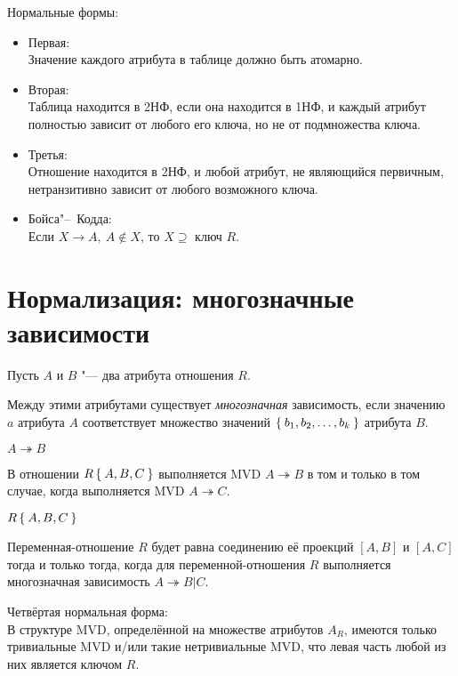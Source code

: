 Нормальные формы:
\begin{itemize}
	\item Первая: \\
		Значение каждого атрибута в таблице должно быть атомарно.
	\item Вторая: \\
		Таблица находится в 2НФ, если она находится в 1НФ, и каждый атрибут полностью зависит от любого его ключа, но не от подмножества ключа.
	\item Третья: \\
		Отношение находится в 2НФ, и любой атрибут, не являющийся первичным, нетранзитивно зависит от любого возможного ключа.
	\item Бойса"--~Кодда: \\
		Если $ X \to A, ~ A \not\in X $, то $ X \supseteq $ ключ $ R $.
\end{itemize}

\section{Нормализация: многозначные зависимости}

\begin{definition}
	Пусть $ A $ и $ B $ "--- два атрибута отношения $ R $.

	Между этими атрибутами существует \emph{многозначная} зависимость, если значению $ a $ атрибута $ A $ соответствует множество значений $ \Set{b_1, b_2, \dots, b_k} $ атрибута $ B $.
\end{definition}

\begin{notation}
	$ A \twoheadrightarrow B $
\end{notation}

\begin{lemma}[Фейджина]
	В отношении $ R \Set{A, B, C} $ выполняется MVD $ A \twoheadrightarrow B $ в том и только в том случае, когда выполняется MVD $ A \twoheadrightarrow C $.
\end{lemma}

\begin{theorem}[Фейджина]
	$ R \Set{A, B, C} $

	Переменная-отношение $ R $ будет равна соединению её проекций $ [A, B] $ и $ [A, C] $ тогда и только тогда, когда для переменной-отношения $ R $ выполняется многозначная зависимость $ A \twoheadrightarrow B | C $.
\end{theorem}

Четвёртая нормальная форма: \\
В структуре MVD, определённой на множестве атрибутов $ A_R $, имеются только тривиальные MVD и/или такие нетривиальные MVD, что левая часть любой из них является ключом $ R $.
